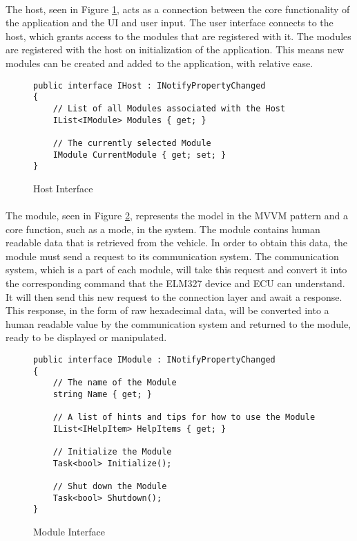 	\paragraph{}{
	The host, seen in Figure \ref{code:HostInterface}, acts as a connection between the core functionality of the application and the UI and user input. The user interface connects to the host, which grants access to the modules that are registered with it. The modules are registered with the host on initialization of the application. This means new modules can be created and added to the application, with relative ease.
	}
		
	\begin{figure}[h]
		\begin{lstlisting}
public interface IHost : INotifyPropertyChanged
{
	// List of all Modules associated with the Host
	IList<IModule> Modules { get; }
	
	// The currently selected Module
	IModule CurrentModule { get; set; }
}
		\end{lstlisting}
		\caption{Host Interface}
		\label{code:HostInterface}
	\end{figure}
	
	\paragraph{}{
	The module, seen in Figure \ref{code:ModuleInterface}, represents the model in the MVVM pattern and a core function, such as a mode, in the system. The module contains human readable data that is retrieved from the vehicle. In order to obtain this data, the module must send a request to its communication system. The communication system, which is a part of each module, will take this request and convert it into the corresponding command that the ELM327 device and ECU can understand. It will then send this new request to the connection layer and await a response. This response, in the form of raw hexadecimal data, will be converted into a human readable value by the communication system and returned to the module, ready to be displayed or manipulated.
	}
	\begin{figure}[h]
		\begin{lstlisting}
public interface IModule : INotifyPropertyChanged
{
	// The name of the Module
	string Name { get; }
	
	// A list of hints and tips for how to use the Module
	IList<IHelpItem> HelpItems { get; }

	// Initialize the Module
	Task<bool> Initialize();

	// Shut down the Module
	Task<bool> Shutdown(); 
}
		\end{lstlisting}
		\caption{Module Interface}
		\label{code:ModuleInterface}
	\end{figure}
	
